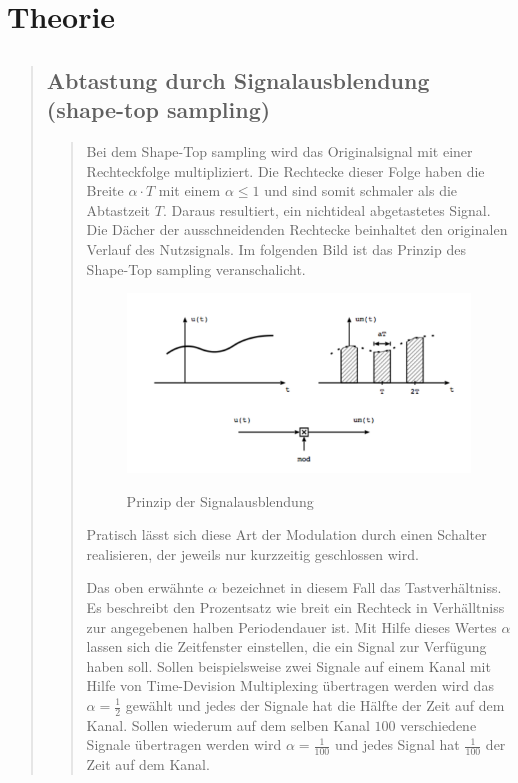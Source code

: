 \section{Theorie}
\begin{quote}
	\subsection{Abtastung durch Signalausblendung (shape-top sampling)}
    \begin{quote} 
        Bei dem Shape-Top sampling wird das Originalsignal mit einer Rechteckfolge multipliziert. Die Rechtecke dieser
        Folge haben die Breite $\alpha \cdot T$ mit einem $\alpha \leq 1$ und sind somit schmaler als die Abtastzeit
        $T$. Daraus resultiert, ein nichtideal abgetastetes Signal. Die Dächer der ausschneidenden Rechtecke
        beinhaltet den originalen Verlauf des Nutzsignals. Im folgenden Bild ist das Prinzip des
        Shape-Top sampling veranschalicht.\\

        \begin{figure}[H]
        \centering
            \includegraphics[scale=0.6, trim = 0cm 0cm 0cm 0cm, clip]{./Bilder/PrinzipSignalausblendung}
                \caption{Prinzip der Signalausblendung}
                \cite{PrinzipSignalausblendung}
        \end{figure}
    
        Pratisch lässt sich diese Art der Modulation durch einen Schalter realisieren, der jeweils nur
        kurzzeitig geschlossen wird.\vspace{1em}
        
        Das oben erwähnte $\alpha$ bezeichnet in diesem Fall das
        Tastverhältniss. Es beschreibt den Prozentsatz wie breit ein Rechteck in Verhälltniss zur angegebenen halben 
        Periodendauer ist. Mit Hilfe dieses Wertes $\alpha$ lassen sich die Zeitfenster einstellen, 
        die ein Signal zur Verfügung haben soll. Sollen beispielsweise zwei Signale auf einem Kanal mit Hilfe 
        von Time-Devision Multiplexing übertragen werden wird das $\alpha =
        \frac{1}{2}$ gewählt und jedes der Signale hat die Hälfte der Zeit auf dem Kanal. Sollen wiederum auf dem selben 
        Kanal $100$ verschiedene Signale übertragen werden wird $\alpha = \frac{1}{100}$ und jedes Signal hat
        $\frac{1}{100}$ der Zeit auf dem Kanal.\vspace{1em}
        

\end{quote}
\end{quote}
